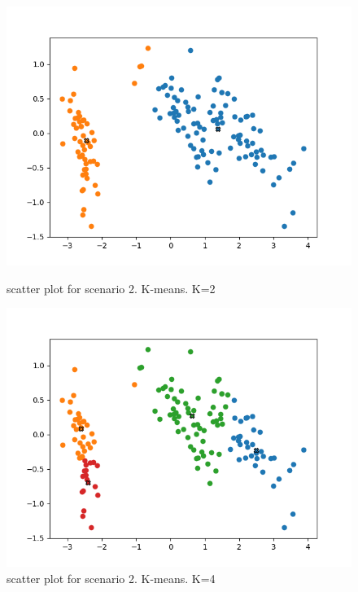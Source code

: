 \documentclass[a4paper]{article}
\begin{document}
\begin{figure}[h!]
\begin{minipage}[t]{6.5cm}
              \includegraphics[width=1.0\textwidth]{pca_k_s2_2.png}
              \caption{scatter plot for scenario 2. K-means. K=2}
            \end{minipage}
            \hspace{2cm}
            \begin{minipage}[t]{6.5cm}
              \includegraphics[width=1.0\textwidth]{pca_k_s2_4.png}
              \caption{scatter plot for scenario 2. K-means. K=4}
            \end{minipage}
        \end{figure}
        \clearpage
\end{document}
